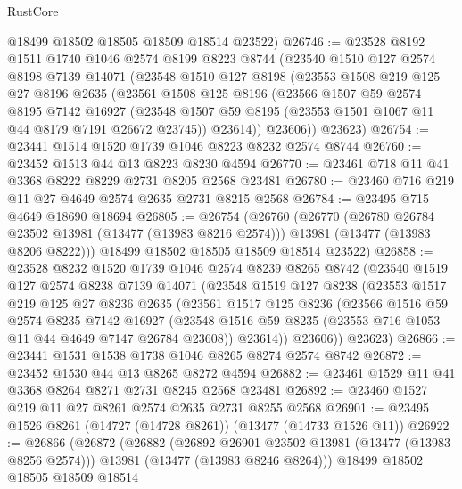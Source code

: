 \begin{lexlean}{RustCore}
\begin{coremodule}
      @18499
      @18502
      @18505
      @18509
      @18514
      @23522)
@26746 := @23528
    @8192
    @1511
    @1740
    @1046
    @2574
    @8199
    @8223
    @8744
    (@23540
      @1510
      @127
      @2574
      @8198
      @7139
      @14071
      (@23548
        @1510
        @127
        @8198
        (@23553
          @1508
          @219
          @125
          @27
          @8196
          @2635
          (@23561
            @1508
            @125
            @8196
            (@23566
              @1507
              @59
              @2574
              @8195
              @7142
              @16927
              (@23548 @1507 @59 @8195 (@23553 @1501 @1067 @11 @44 @8179 @7191 @26672 @23745))
              @23614))
          @23606))
      @23623)
@26754 := @23441 @1514 @1520 @1739 @1046 @8223 @8232 @2574 @8744
@26760 := @23452 @1513 @44 @13 @8223 @8230 @4594
@26770 := @23461 @718 @11 @41 @3368 @8222 @8229 @2731 @8205 @2568 @23481
@26780 := @23460 @716 @219 @11 @27 @4649 @2574 @2635 @2731 @8215 @2568
@26784 := @23495 @715 @4649 @18690 @18694
@26805 := @26754
    (@26760
      (@26770
        (@26780 @26784 @23502 @13981 (@13477 (@13983 @8216 @2574)))
        @13981
        (@13477 (@13983 @8206 @8222)))
      @18499
      @18502
      @18505
      @18509
      @18514
      @23522)
@26858 := @23528
    @8232
    @1520
    @1739
    @1046
    @2574
    @8239
    @8265
    @8742
    (@23540
      @1519
      @127
      @2574
      @8238
      @7139
      @14071
      (@23548
        @1519
        @127
        @8238
        (@23553
          @1517
          @219
          @125
          @27
          @8236
          @2635
          (@23561
            @1517
            @125
            @8236
            (@23566
              @1516
              @59
              @2574
              @8235
              @7142
              @16927
              (@23548 @1516 @59 @8235 (@23553 @716 @1053 @11 @44 @4649 @7147 @26784 @23608))
              @23614))
          @23606))
      @23623)
@26866 := @23441 @1531 @1538 @1738 @1046 @8265 @8274 @2574 @8742
@26872 := @23452 @1530 @44 @13 @8265 @8272 @4594
@26882 := @23461 @1529 @11 @41 @3368 @8264 @8271 @2731 @8245 @2568 @23481
@26892 := @23460 @1527 @219 @11 @27 @8261 @2574 @2635 @2731 @8255 @2568
@26901 := @23495 @1526 @8261 (@14727 (@14728 @8261)) (@13477 (@14733 @1526 @11))
@26922 := @26866
    (@26872
      (@26882
        (@26892 @26901 @23502 @13981 (@13477 (@13983 @8256 @2574)))
        @13981
        (@13477 (@13983 @8246 @8264)))
      @18499
      @18502
      @18505
      @18509
      @18514

\end{coremodule}
\end{lexlean}
